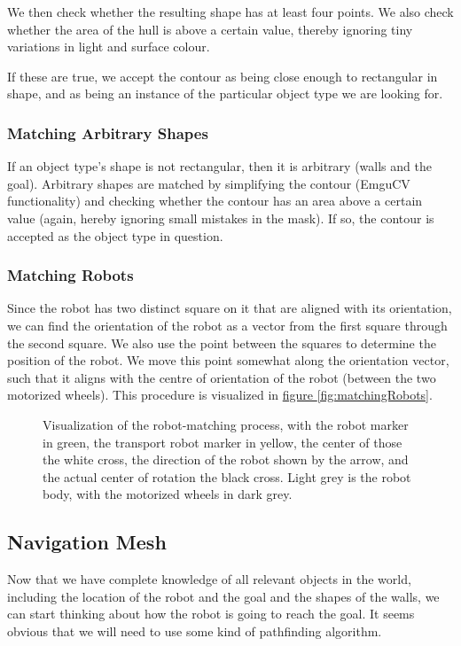 \documentclass[10pt, abstracton, twocolumn]{scrartcl}
\newcommand{\fref}[1]{\hyperref[#1]{figure \vref{#1}}}
\begin{document}
We then check whether the resulting shape has at least four points. We also check whether the area of the hull is above a certain value, thereby ignoring tiny variations in light and surface colour.

If these are true, we accept the contour as being close enough to rectangular in shape, and as being an instance of the particular object type we are looking for. 

\subsubsection{Matching Arbitrary Shapes}
If an object type's shape is not rectangular, then it is arbitrary (walls and the goal). Arbitrary shapes are matched by simplifying the contour (EmguCV functionality) and checking whether the contour has an area above a certain value (again, hereby ignoring small mistakes in the mask). If so, the contour is accepted as the object type in question.

\subsubsection{Matching Robots}
Since the robot has two distinct square on it that are aligned with its orientation, we can find the orientation of the robot as a vector from the first square through the second square. We also use the point between the squares to determine the position of the robot. We move this point somewhat along the orientation vector, such that it aligns with the centre of orientation of the robot (between the two motorized wheels). This procedure is visualized in \fref{fig:matchingRobots}.

\begin{figure}[h]
        \centering
        
        \caption{\small Visualization of the robot-matching process, with the robot marker in green, the transport robot marker in yellow, the center of those the white cross, the direction of the robot shown by the arrow, and the actual center of rotation the black cross. Light grey is the robot body, with the motorized wheels in dark grey.}
        \label{fig:matchingRobots}
\end{figure}

\subsection{Navigation Mesh}
Now that we have complete knowledge of all relevant objects in the world, including the location of the robot and the goal and the shapes of the walls, we can start thinking about how the robot is going to reach the goal. It seems obvious that we will need to use some kind of pathfinding algorithm.
\end{document}
